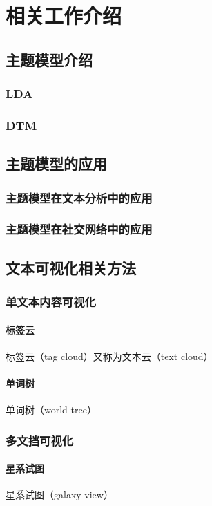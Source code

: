 \chapter{相关工作介绍}
\section{主题模型介绍}

\subsection{LDA}
\subsection{DTM}

\section{主题模型的应用}

\subsection{主题模型在文本分析中的应用}
\subsection{主题模型在社交网络中的应用}

\section{文本可视化相关方法}
\subsection{单文本内容可视化}
\subsubsection{标签云}
标签云（tag cloud）又称为文本云（text cloud）

\subsubsection{单词树}
单词树（world tree）

\subsection{多文挡可视化}
\subsubsection{星系试图}
星系试图（galaxy view）

